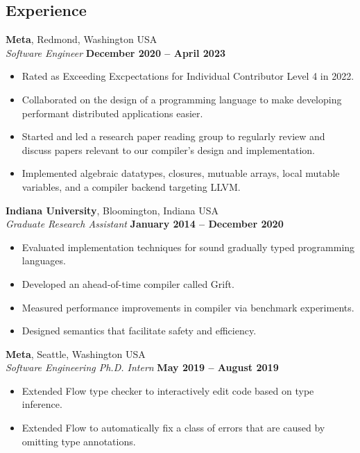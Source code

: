 \documentclass[resmargin,line]{res}
\begin{document}
\begin{resume}

\section{\sc Experience}

{\bf Meta}, Redmond, Washington USA\\
{\em Software Engineer} \hfill {\bf December 2020 -- April 2023}\\
%
\begin{itemize}
\vspace*{-.3cm}
\item Rated as Exceeding Excpectations for Individual Contributor Level 4 in 2022.  
\item Collaborated on the design of a programming language to make developing performant distributed applications easier.
\item Started and led a research paper reading group to regularly review and discuss papers relevant to our compiler's design and implementation.
\item Implemented algebraic datatypes, closures, mutuable arrays, local mutable variables, and a compiler backend targeting LLVM.
\end{itemize}

{\bf Indiana University}, Bloomington, Indiana USA\\
{\em Graduate Research Assistant} \hfill {\bf January 2014 -- December 2020}\\
%
\begin{itemize}
\vspace*{-.3cm}
\item Evaluated implementation techniques for sound gradually typed
  programming languages.
\item Developed an ahead-of-time compiler called Grift.
\item Measured performance improvements in compiler via benchmark experiments.
\item Designed semantics that facilitate safety and efficiency.
\end{itemize}

{\bf Meta}, Seattle, Washington USA\\
{\em Software Engineering Ph.D. Intern} \hfill {\bf May 2019 -- August 2019}\\
%
\begin{itemize}
\vspace*{-.3cm}
\item Extended Flow type checker to interactively edit code based on type inference.
\item Extended Flow to automatically fix a class of errors that are caused by omitting
  type annotations.
\end{itemize}


\end{resume}
\end{document}
